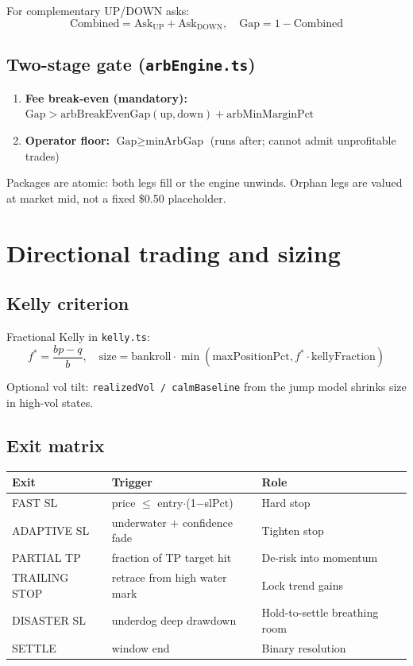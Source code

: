 \documentclass[11pt,a4paper]{report}
\begin{document}
For complementary UP/DOWN asks:
\[
\text{Combined} = \text{Ask}_{\text{UP}} + \text{Ask}_{\text{DOWN}}, \quad
\text{Gap} = 1 - \text{Combined}
\]

\section{Two-stage gate (\texttt{arbEngine.ts})}

\begin{enumerate}
  \item \textbf{Fee break-even (mandatory):}
  $\text{Gap} > \text{arbBreakEvenGap}(\text{up},\text{down}) + \text{arbMinMarginPct}$
  \item \textbf{Operator floor:} $\text{Gap} \geq \text{minArbGap}$ (runs after; cannot admit unprofitable trades)
\end{enumerate}

Packages are atomic: both legs fill or the engine unwinds. Orphan legs are valued at
market mid, not a fixed \$0.50 placeholder.

\chapter{Directional trading and sizing}

\section{Kelly criterion}

Fractional Kelly in \texttt{kelly.ts}:
\[
f^* = \frac{bp - q}{b}, \quad
\text{size} = \text{bankroll} \cdot \min(\text{maxPositionPct}, f^* \cdot \text{kellyFraction})
\]

Optional vol tilt: \texttt{realizedVol / calmBaseline} from the jump model shrinks size in high-vol states.

\section{Exit matrix}

\begin{longtable}{@{}lll@{}}
\toprule
Exit & Trigger & Role \\
\midrule
\endhead
FAST SL & price $\leq$ entry$\cdot$(1$-$slPct) & Hard stop \\
ADAPTIVE SL & underwater + confidence fade & Tighten stop \\
PARTIAL TP & fraction of TP target hit & De-risk into momentum \\
TRAILING STOP & retrace from high water mark & Lock trend gains \\
DISASTER SL & underdog deep drawdown & Hold-to-settle breathing room \\
SETTLE & window end & Binary resolution \\
\bottomrule
\end{longtable}
\end{document}

